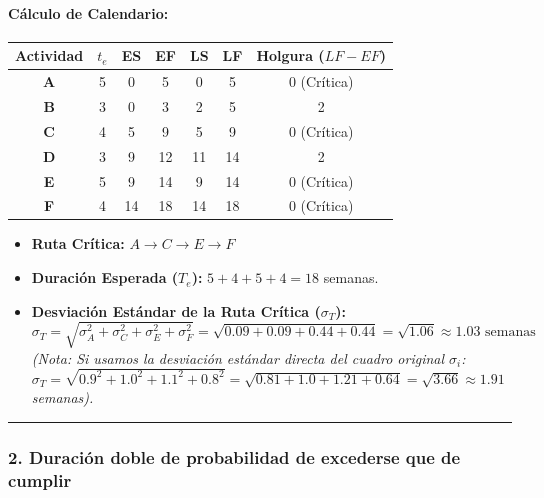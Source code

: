\documentclass[
]{article}
\providecommand{\tightlist}{%
  \setlength{\itemsep}{0pt}\setlength{\parskip}{0pt}}
\begin{document}
\hypertarget{cuxe1lculo-de-calendario}{%
\paragraph{Cálculo de Calendario:}\label{cuxe1lculo-de-calendario}}

\begin{longtable}[]{@{}ccccccc@{}}
\toprule\noalign{}
Actividad & \(t_e\) & ES & EF & LS & LF & Holgura (\(LF - EF\)) \\
\midrule\noalign{}
\endhead
\bottomrule\noalign{}
\endlastfoot
\textbf{A} & 5 & 0 & 5 & 0 & 5 & 0 (Crítica) \\
\textbf{B} & 3 & 0 & 3 & 2 & 5 & 2 \\
\textbf{C} & 4 & 5 & 9 & 5 & 9 & 0 (Crítica) \\
\textbf{D} & 3 & 9 & 12 & 11 & 14 & 2 \\
\textbf{E} & 5 & 9 & 14 & 9 & 14 & 0 (Crítica) \\
\textbf{F} & 4 & 14 & 18 & 14 & 18 & 0 (Crítica) \\
\end{longtable}

\begin{itemize}
\tightlist
\item
  \textbf{Ruta Crítica:} \(A \rightarrow C \rightarrow E \rightarrow F\)
\item
  \textbf{Duración Esperada (\(T_e\)):} \(5 + 4 + 5 + 4 = 18\) semanas.
\item
  \textbf{Desviación Estándar de la Ruta Crítica (\(\sigma_T\)):}
  \[\sigma_T = \sqrt{\sigma_A^2 + \sigma_C^2 + \sigma_E^2 + \sigma_F^2} = \sqrt{0.09 + 0.09 + 0.44 + 0.44} = \sqrt{1.06} \approx 1.03 \text{ semanas}\]
  \emph{(Nota: Si usamos la desviación estándar directa del cuadro
  original \(\sigma_i\):
  \(\sigma_T = \sqrt{0.9^2 + 1.0^2 + 1.1^2 + 0.8^2} = \sqrt{0.81 + 1.0 + 1.21 + 0.64} = \sqrt{3.66} \approx 1.91\)
  semanas).}
\end{itemize}

\begin{center}\rule{0.5\linewidth}{0.5pt}\end{center}

\hypertarget{duraciuxf3n-doble-de-probabilidad-de-excederse-que-de-cumplir}{%
\subsubsection{2. Duración doble de probabilidad de excederse que de
cumplir}\label{duraciuxf3n-doble-de-probabilidad-de-excederse-que-de-cumplir}}
\end{document}

